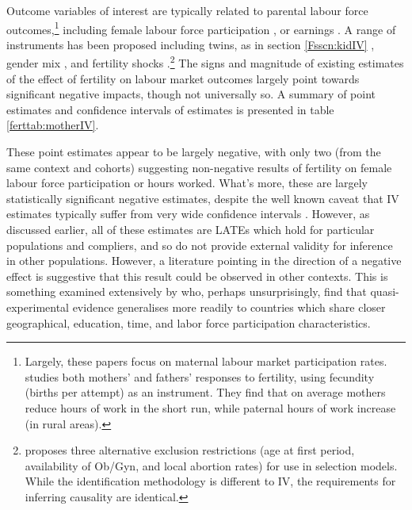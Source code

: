 \documentclass{article}
\begin{document}
\begin{spacing}{1.4}
Outcome variables of interest are typically related to parental labour 
force outcomes,\footnote{Largely, these papers focus on maternal labour
market participation rates. \citet{KimAassve2006} studies both mothers' and
fathers' responses to fertility, using fecundity (births per attempt) as an
instrument.  They find that on average mothers reduce hours of work in the short 
run, while paternal hours of work increase (in rural areas).} including female 
labour force participation \citep{AgueroMarks2008,AgueroMarks2011,ChunOh2002,
Caceres2008,AngristEvans1998}, or earnings \citep{Caceres2006,Hotzetal1997,
Jacobsenetal1999}.  A range of instruments has been proposed including twins,
as in section \ref{Fsscn:kidIV} \citep{RosenzweigWolpin1980b,Jacobsenetal1999,
BronarsGrogger1994,Caceres2012}, gender mix \citep{AgueroMarks2008,
AgueroMarks2011,ChunOh2002}, and fertility shocks \citep{Miller2011,Cristia2008,
RosenzweigSchultz1987}.\footnote{\citet{Ribar1994} proposes three alternative
exclusion restrictions (age at first period, availability of Ob/Gyn, and local
abortion rates) for use in selection models.  While the identification 
methodology is different to IV, the requirements for inferring causality are 
identical.}  The signs and magnitude of existing estimates of the effect of 
fertility on labour market outcomes largely point towards significant negative 
impacts, though not universally so.  A summary of point estimates and 
confidence intervals of estimates is presented in table \ref{ferttab:motherIV}.



These point estimates appear to be largely negative, with only two (from the
same context and cohorts) suggesting non-negative results of fertility on
female labour force participation or hours worked.  What's more, these are
largely statistically significant negative estimates, despite the well known 
caveat that IV estimates typically suffer from very wide confidence intervals 
\citep{Angristetal2010}.  However, as discussed earlier, all of these
estimates are LATEs which hold for particular populations and compliers, and
so do not provide external validity for inference in other populations. 
However, a literature pointing in the direction of a negative effect is
suggestive that this result could be observed in other contexts.  This is
something examined extensively by \citet{Deheijaetal2015} who, perhaps
unsurprisingly, find that quasi-experimental evidence generalises more
readily to countries which share closer geographical, education, time, 
and labor force participation characteristics.


\end{spacing}
\end{document}
